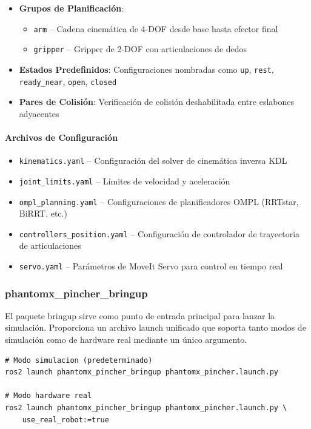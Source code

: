 \begin{itemize}
    \item \textbf{Grupos de Planificación}:
    \begin{itemize}
        \item \texttt{arm} -- Cadena cinemática de 4-DOF desde base hasta efector final
        \item \texttt{gripper} -- Gripper de 2-DOF con articulaciones de dedos
    \end{itemize}
    \item \textbf{Estados Predefinidos}: Configuraciones nombradas como \texttt{up}, \texttt{rest}, \texttt{ready\_near}, \texttt{open}, \texttt{closed}
    \item \textbf{Pares de Colisión}: Verificación de colisión deshabilitada entre eslabones adyacentes
\end{itemize}

\paragraph{Archivos de Configuración}

\begin{itemize}
    \item \texttt{kinematics.yaml} -- Configuración del solver de cinemática inversa KDL
    \item \texttt{joint\_limits.yaml} -- Límites de velocidad y aceleración
    \item \texttt{ompl\_planning.yaml} -- Configuraciones de planificadores OMPL (RRTstar, BiRRT, etc.)
    \item \texttt{controllers\_position.yaml} -- Configuración de controlador de trayectoria de articulaciones
    \item \texttt{servo.yaml} -- Parámetros de MoveIt Servo para control en tiempo real
\end{itemize}

\subsubsection{phantomx\_pincher\_bringup}

El paquete bringup sirve como punto de entrada principal para lanzar la simulación. Proporciona un archivo launch unificado que soporta tanto modos de simulación como de hardware real mediante un único argumento.

\begin{verbatim}
# Modo simulacion (predeterminado)
ros2 launch phantomx_pincher_bringup phantomx_pincher.launch.py

# Modo hardware real
ros2 launch phantomx_pincher_bringup phantomx_pincher.launch.py \
    use_real_robot:=true
\end{verbatim}

